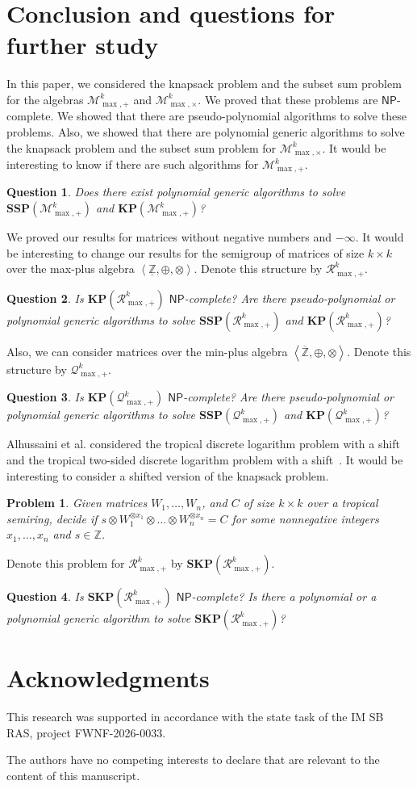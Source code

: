 \documentclass[reqno,12pt]{amsart}
\newtheorem{problem}{Problem}
\newtheorem{question}{Question}
\theoremstyle{definition}
\newcommand{\NP}{\mathsf{NP}}
\newcommand{\MP}{\mathcal{M}_{\max, {+}}^k}
\newcommand{\MT}{\mathcal{M}_{\max, {\times}}^k}
\newcommand{\RP}{\mathcal{R}_{\max, {+}}^k}
\newcommand{\QP}{\mathcal{Q}_{\max, {+}}^k}
\newcommand{\SSMPP}{\mathbf{SSP}(\MP)}
\newcommand{\KMPP}{\mathbf{KP}(\MP)}
\begin{document}
 
\section{Conclusion and questions for further study}
In this paper, we considered the knapsack problem and the subset sum problem for the algebras $\MP$ and $\MT$. We proved that these problems are $\NP$-complete. We showed that
there are pseudo-polynomial algorithms to solve these problems. Also, we showed that there
are polynomial generic algorithms to solve the knapsack problem and the subset sum problem for $\MT$. It would be interesting to know if there are such algorithms for $\MP$.
\begin{question}
Does there exist polynomial generic algorithms to solve $\SSMPP$ and $\KMPP$?
\end{question}

We proved our results for matrices without negative numbers and $-\infty$. It would be interesting to change our results for the semigroup of matrices of size $k \times k$ over the max-plus algebra
$\left<\underline{\mathbb{Z}}, \oplus, \otimes\right>$.
Denote this structure by $\RP$.   
\begin{question}
    Is $\mathbf{KP}(\RP)$ $\NP$-complete?
    Are there pseudo-polynomial or polynomial generic algorithms to solve $\mathbf{SSP}(\RP)$ and $\mathbf{KP}(\RP)$?
\end{question}

Also, we can consider matrices over the min-plus algebra $\left<\overline{\mathbb{Z}}, \oplus, \otimes\right>$. Denote this structure by $\QP$.  
\begin{question}
    Is $\mathbf{KP}(\QP)$ $\NP$-complete?
    Are there pseudo-polynomial or polynomial generic algorithms to solve $\mathbf{SSP}(\QP)$ and $\mathbf{KP}(\QP)$?
\end{question}

Alhussaini et al. considered the tropical discrete logarithm problem with a shift and the tropical two-sided discrete logarithm problem with a shift~\cite{AlhussainiCollettSergeev2024}.
It would be interesting to consider a shifted version of the knapsack problem.
\begin{problem}
    Given matrices $W_1, \ldots, W_n$, and $C$ of size $k \times k$ over a tropical semiring, decide if $s \otimes W_1^{\otimes x_1} \otimes \ldots \otimes  W_n^{\otimes x_n} = C$ for some nonnegative integers $x_1, \ldots, x_n$ and $s \in \mathbb{Z}$.
\end{problem}
Denote this problem for $\RP$ by $\textbf{SKP}(\RP)$.
\begin{question}
    Is $\mathbf{SKP}(\RP)$ $\NP$-complete? 
    Is there a polynomial or a polynomial generic algorithm to solve $\mathbf{SKP}(\RP)$?
\end{question}


\section*{Acknowledgments}

This research was supported in accordance with the state task of the IM SB RAS, project FWNF-2026-0033.

The authors have no competing interests to declare that are relevant to the content of this manuscript.

\renewcommand*{\bibfont}{\small}
\printbibliography
\end{document}
